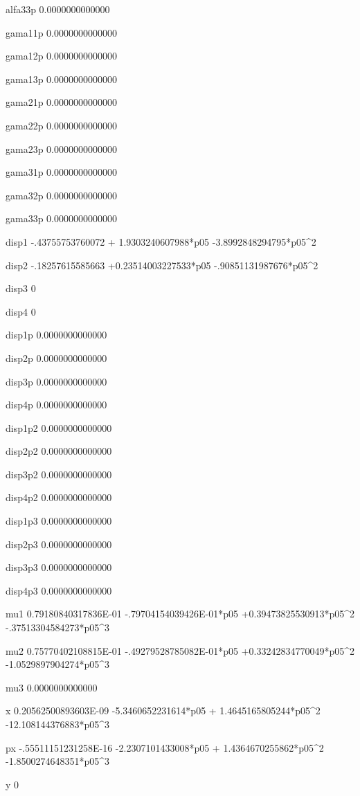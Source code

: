 alfa33p
   0.0000000000000 
  
 gama11p
   0.0000000000000 
  
 gama12p
   0.0000000000000 
  
 gama13p
   0.0000000000000 
  
 gama21p
   0.0000000000000 
  
 gama22p
   0.0000000000000 
  
 gama23p
   0.0000000000000 
  
 gama31p
   0.0000000000000 
  
 gama32p
   0.0000000000000 
  
 gama33p
   0.0000000000000 
  
 disp1  
  -.43755753760072 + 1.9303240607988*p05  -3.8992848294795*p05^2 
  
 disp2  
  -.18257615585663 +0.23514003227533*p05  -.90851131987676*p05^2 
  
 disp3  
 0 
  
 disp4  
 0 
  
 disp1p 
   0.0000000000000 
  
 disp2p 
   0.0000000000000 
  
 disp3p 
   0.0000000000000 
  
 disp4p 
   0.0000000000000 
  
 disp1p2
   0.0000000000000 
  
 disp2p2
   0.0000000000000 
  
 disp3p2
   0.0000000000000 
  
 disp4p2
   0.0000000000000 
  
 disp1p3
   0.0000000000000 
  
 disp2p3
   0.0000000000000 
  
 disp3p3
   0.0000000000000 
  
 disp4p3
   0.0000000000000 
  
 mu1    
  0.79180840317836E-01  -.79704154039426E-01*p05 +0.39473825530913*p05^2  -.37513304584273*p05^3 
  
 mu2    
  0.75770402108815E-01  -.49279528785082E-01*p05 +0.33242834770049*p05^2  -1.0529897904274*p05^3 
  
 mu3    
   0.0000000000000 
  
 x      
  0.20562500893603E-09  -5.3460652231614*p05 + 1.4645165805244*p05^2  -12.108144376883*p05^3 
  
 px     
  -.55511151231258E-16  -2.2307101433008*p05 + 1.4364670255862*p05^2  -1.8500274648351*p05^3 
  
 y      
 0 
  
